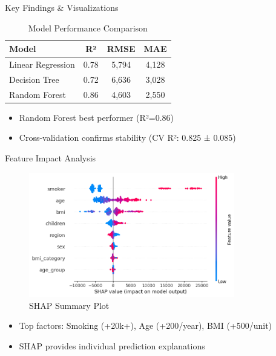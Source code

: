 \documentclass[10pt]{beamer}
\begin{document}
\begin{frame}{Key Findings \& Visualizations}
\begin{table}[h]
\centering
\begin{tabular}{@{}lccc@{}}
\toprule
Model & R² & RMSE & MAE \\
\midrule
Linear Regression & 0.78 & 5,794 & 4,128 \\
Decision Tree & 0.72 & 6,636 & 3,028 \\
Random Forest & 0.86 & 4,603 & 2,550 \\
\bottomrule
\end{tabular}
\caption{Model Performance Comparison}
\end{table}
\begin{itemize}
\item Random Forest best performer (R²=0.86)
\item Cross-validation confirms stability (CV R²: 0.825 ± 0.085)
\end{itemize}
\end{frame}

\begin{frame}{Feature Impact Analysis}
\begin{figure}
\includegraphics[width=0.8\textwidth]{shap_summary.png}
\caption{SHAP Summary Plot}
\end{figure}
\begin{itemize}
\item Top factors: Smoking (+20k+), Age (+200/year), BMI (+500/unit)
\item SHAP provides individual prediction explanations
\end{itemize}
\end{frame}
\end{document}
